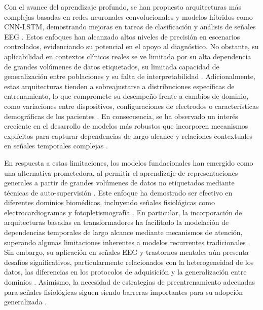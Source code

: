 Con el avance del aprendizaje profundo, se han propuesto arquitecturas más complejas basadas en redes neuronales convolucionales y modelos híbridos como CNN-LSTM, demostrando mejoras en tareas de clasificación y análisis de señales EEG \cite{Paraschiv2024676,Arji2023,AHMADI2021102227}. Estos enfoques han alcanzado altos niveles de precisión en escenarios controlados, evidenciando su potencial en el apoyo al diagnóstico. No obstante, su aplicabilidad en contextos clínicos reales se ve limitada por su alta dependencia de grandes volúmenes de datos etiquetados, su limitada capacidad de generalización entre poblaciones y su falta de interpretabilidad \cite{emam2021statedatacomputervision,healthcare11030285}. Adicionalmente, estas arquitecturas tienden a sobreajustarse a distribuciones específicas de entrenamiento, lo que compromete su desempeño frente a cambios de dominio, como variaciones entre dispositivos, configuraciones de electrodos o características demográficas de los pacientes \cite{Kim2025DG}. En consecuencia, se ha observado un interés creciente en el desarrollo de modelos más robustos que incorporen mecanismos explícitos para capturar dependencias de largo alcance y relaciones contextuales en señales temporales complejas \cite{s25051293}.

En respuesta a estas limitaciones, los modelos fundacionales han emergido como una alternativa prometedora, al permitir el aprendizaje de representaciones generales a partir de grandes volúmenes de datos no etiquetados mediante técnicas de auto-supervisión \cite{Mathew2024,Abbaspourazad2023}. Este enfoque ha demostrado ser efectivo en diferentes dominios biomédicos, incluyendo señales fisiológicas como electrocardiogramas y fotopletismografía \cite{Abbaspourazad2024,cui2024neurogptfoundationmodeleeg}. En particular, la incorporación de arquitecturas basadas en transformadores ha facilitado la modelación de dependencias temporales de largo alcance mediante mecanismos de atención, superando algunas limitaciones inherentes a modelos recurrentes tradicionales \cite{s25051293}. Sin embargo, su aplicación en señales EEG y trastornos mentales aún presenta desafíos significativos, particularmente relacionados con la heterogeneidad de los datos, las diferencias en los protocolos de adquisición y la generalización entre dominios \cite{APICELLA2024128354}. Asimismo, la necesidad de estrategias de preentrenamiento adecuadas para señales fisiológicas siguen siendo barreras importantes para su adopción generalizada \cite{weng2024selfsupervisedlearningelectroencephalogramsystematic}.

